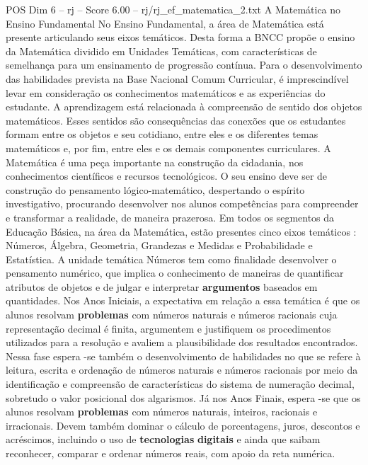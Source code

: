 \begin{textsample}{POS Dim 6 – rj – Score 6.00 – rj/rj\_ef\_matematica\_2.txt}  \label{ex:f6_pos_278}
A Matemática no Ensino Fundamental No Ensino Fundamental, a área de Matemática está presente articulando seus eixos temáticos.
Desta forma a BNCC propõe o ensino da Matemática dividido em Unidades Temáticas, com características de semelhança para um ensinamento de progressão contínua.
Para o desenvolvimento das habilidades prevista na Base Nacional Comum Curricular, é imprescindível levar em consideração os conhecimentos matemáticos e as experiências do estudante.
A aprendizagem está relacionada à compreensão de sentido dos objetos matemáticos.
Esses sentidos são consequências das conexões que os estudantes formam entre os objetos e seu cotidiano, entre eles e os diferentes temas matemáticos e, por fim, entre eles e os demais componentes curriculares.
A Matemática é uma peça importante na construção da cidadania, nos conhecimentos científicos e recursos tecnológicos.
O seu ensino deve ser de construção do pensamento lógico-matemático, despertando o espírito investigativo, procurando desenvolver nos alunos competências para compreender e transformar a realidade, de maneira prazerosa.
Em todos os segmentos da Educação Básica, na área da Matemática, estão presentes cinco eixos temáticos : Números, Álgebra, Geometria, Grandezas e Medidas e Probabilidade e Estatística.
A unidade temática Números tem como finalidade desenvolver o pensamento numérico, que implica o conhecimento de maneiras de quantificar atributos de objetos e de julgar e interpretar \textbf{argumentos} baseados em quantidades.
Nos Anos Iniciais, a expectativa em relação a essa temática é que os alunos resolvam \textbf{problemas} com números naturais e números racionais cuja representação decimal é finita, argumentem e justifiquem os procedimentos utilizados para a resolução e avaliem a plausibilidade dos resultados encontrados.
Nessa fase espera -se também o desenvolvimento de habilidades no que se refere à leitura, escrita e ordenação de números naturais e números racionais por meio da identificação e compreensão de características do sistema de numeração decimal, sobretudo o valor posicional dos algarismos.
Já nos Anos Finais, espera -se que os alunos resolvam \textbf{problemas} com números naturais, inteiros, racionais e irracionais.
Devem também dominar o cálculo de porcentagens, juros, descontos e acréscimos, incluindo o uso de \textbf{tecnologias} \textbf{digitais} e ainda que saibam reconhecer, comparar e ordenar números reais, com apoio da reta numérica.

\end{textsample}
